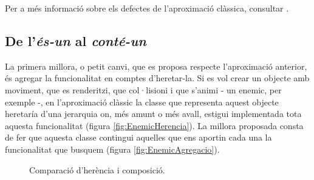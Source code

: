 Per a més informació sobre els defectes de l'aproximació clàssica, consultar \cite{Wilson02}.

\subsection{De l'{\em és-un} al {\em conté-un}}

La primera millora, o petit canvi, que es proposa respecte l'aproximació anterior, és agregar la funcionalitat en comptes d'heretar-la. Si es vol crear un objecte amb moviment, que es renderitzi, que col·lisioni i que s'animi - un enemic, per exemple -, en l'aproximació clàssic la classe que representa aquest objecte heretaría d'una jerarquia on, més amunt o més avall, estigui implementada tota aquesta funcionalitat (figura \ref{fig:EnemicHerencia}). La millora proposada consta de fer que aquesta classe contingui aquelles que ens aportin cada una la funcionalitat que busquem (figura \ref{fig:EnemicAgregacio}).

\begin{figure}
  \centering
  \hspace{0.08\textwidth}
  \caption{Comparació d'herència i composició. \label{fig:HerenciaAgregacio}}
\end{figure}

